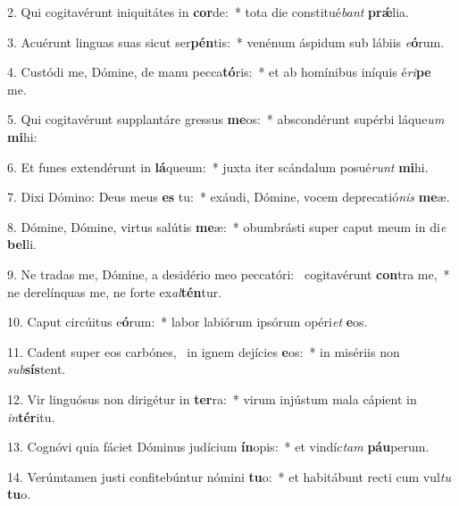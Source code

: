 2. Qui cogitavérunt iniquitátes in \textbf{cor}de:~*  tota die constitué\textit{bant} \textbf{prǽ}lia.\

3. Acuérunt linguas suas sicut ser\textbf{pén}tis:~*  venénum áspidum sub lábiis \textit{e}\textbf{ó}rum.\

4. Custódi me, Dómine, de manu pecca\textbf{tó}ris:~*  et ab homínibus iníquis é\textit{ri}\textbf{pe} me.\

5. Qui cogitavérunt supplantáre gressus \textbf{me}os:~*  abscondérunt supérbi láque\textit{um} \textbf{mi}hi:\

6. Et funes extendérunt in \textbf{lá}queum:~*  juxta iter scándalum posué\textit{runt} \textbf{mi}hi.\

7. Dixi Dómino: Deus meus \textbf{es} tu:~*  exáudi, Dómine, vocem deprecatió\textit{nis} \textbf{me}æ.\

8. Dómine, Dómine, virtus salútis \textbf{me}æ:~*  obumbrásti super caput meum in di\textit{e} \textbf{bel}li.\

9. Ne tradas me, Dómine, a desidério meo peccatóri: \dag\  cogitavérunt \textbf{con}tra me,~*  ne derelínquas me, ne forte ex\textit{al}\textbf{tén}tur.\

10. Caput circúitus e\textbf{ó}rum:~*  labor labiórum ipsórum opéri\textit{et} \textbf{e}os.\

11. Cadent super eos carbónes, \dag\  in ignem dejícies \textbf{e}os:~*  in misériis non \textit{sub}\textbf{sís}tent.\

12. Vir linguósus non dirigétur in \textbf{ter}ra:~*  virum injústum mala cápient in \textit{in}\textbf{tér}itu.\

13. Cognóvi quia fáciet Dóminus judícium \textbf{ín}opis:~*  et vindíc\textit{tam} \textbf{páu}perum.\

14. Verúmtamen justi confitebúntur nómini \textbf{tu}o:~*  et habitábunt recti cum vul\textit{tu} \textbf{tu}o.\

